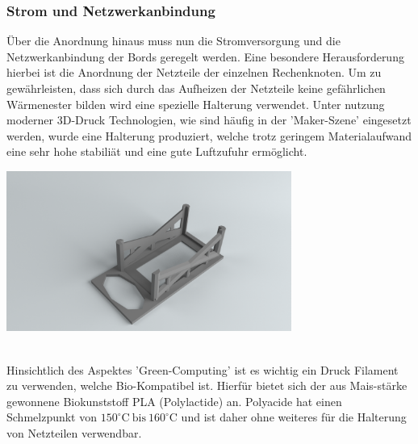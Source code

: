 \subsubsection{Strom und Netzwerkanbindung}
Über die Anordnung hinaus muss nun die Stromversorgung und die Netzwerkanbindung
der Bords geregelt werden. Eine besondere Herausforderung hierbei ist die 
Anordnung der Netzteile der einzelnen Rechenknoten. 
Um zu gewährleisten, dass sich durch das Aufheizen der Netzteile keine gefährlichen
Wärmenester bilden wird eine spezielle Halterung verwendet.
Unter nutzung moderner 3D-Druck Technologien, wie sind häufig in der 'Maker-Szene' eingesetzt werden,
wurde eine Halterung produziert, welche trotz geringem Materialaufwand eine sehr hohe stabiliät 
und eine gute Luftzufuhr ermöglicht.
\begin{minipage}{\textwidth}

\begin{center}
	\includegraphics[width=0.7\textwidth]{./Bilder/Server-Aufbau/RenderPowerSupplyBox30.png}
	\label{fig:sample_figure}

\end{center}	
\end{minipage}
~\\

Hinsichtlich des Aspektes 'Green-Computing' ist es wichtig ein Druck Filament zu verwenden, 
welche Bio-Kompatibel ist. Hierfür bietet sich der aus Mais-stärke gewonnene Biokunststoff PLA
(Polylactide) an. Polyacide hat einen Schmelzpunkt von $150^\circ\text{C}~\text{bis}~160^\circ \text{C}$
und ist daher ohne weiteres für die Halterung von Netzteilen verwendbar.



